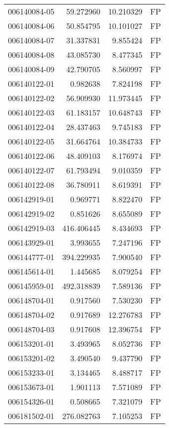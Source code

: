 \begin{tabular}{lrrl}
006140084-05 &   59.272960 &    10.210329 &   FP \\
006140084-06 &   50.854795 &    10.101027 &   FP \\
006140084-07 &   31.337831 &     9.855424 &   FP \\
006140084-08 &   43.085730 &     8.477345 &   FP \\
006140084-09 &   42.790705 &     8.560997 &   FP \\
006140122-01 &    0.982638 &     7.824198 &   FP \\
006140122-02 &   56.909930 &    11.973445 &   FP \\
006140122-03 &   61.183157 &    10.648743 &   FP \\
006140122-04 &   28.437463 &     9.745183 &   FP \\
006140122-05 &   31.664764 &    10.384733 &   FP \\
006140122-06 &   48.409103 &     8.176974 &   FP \\
006140122-07 &   61.793494 &     9.010359 &   FP \\
006140122-08 &   36.780911 &     8.619391 &   FP \\
006142919-01 &    0.969771 &     8.822470 &   FP \\
006142919-02 &    0.851626 &     8.655089 &   FP \\
006142919-03 &  416.406445 &     8.434693 &   FP \\
006143929-01 &    3.993655 &     7.247196 &   FP \\
006144777-01 &  394.229935 &     7.900540 &   FP \\
006145614-01 &    1.445685 &     8.079254 &   FP \\
006145959-01 &  492.318839 &     7.589136 &   FP \\
006148704-01 &    0.917560 &     7.530230 &   FP \\
006148704-02 &    0.917689 &    12.276783 &   FP \\
006148704-03 &    0.917608 &    12.396754 &   FP \\
006153201-01 &    3.493965 &     8.052736 &   FP \\
006153201-02 &    3.490540 &     9.437790 &   FP \\
006153233-01 &    3.134465 &     8.488717 &   FP \\
006153673-01 &    1.901113 &     7.571089 &   FP \\
006154326-01 &    0.508665 &     7.321079 &   FP \\
006181502-01 &  276.082763 &     7.105253 &   FP \\

\end{tabular}
